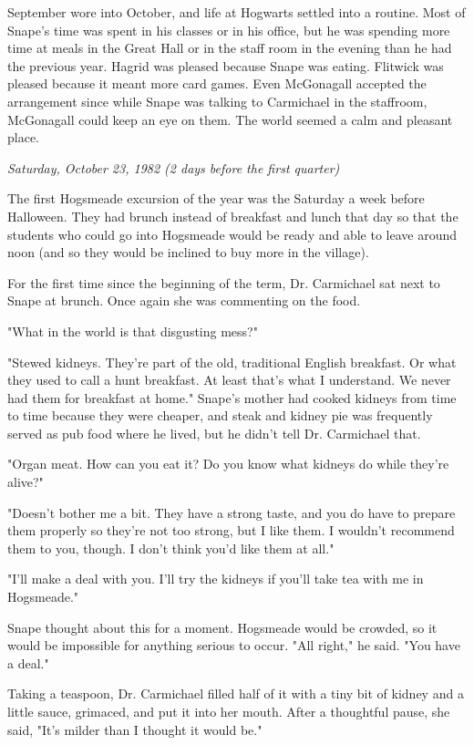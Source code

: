 \documentclass[a4paper,11pt]{article}
\begin{document}
September wore into October, and life at Hogwarts settled into a routine. Most of Snape's time was spent in his classes or in his office, but he was spending more time at meals in the Great Hall or in the staff room in the evening than he had the previous year. Hagrid was pleased because Snape was eating. Flitwick was pleased because it meant more card games. Even McGonagall accepted the arrangement since while Snape was talking to Carmichael in the staffroom, McGonagall could keep an eye on them. The world seemed a calm and pleasant place.

\emph{Saturday, October 23, 1982 (2 days before the first quarter)}

The first Hogsmeade excursion of the year was the Saturday a week before Halloween. They had brunch instead of breakfast and lunch that day so that the students who could go into Hogsmeade would be ready and able to leave around noon (and so they would be inclined to buy more in the village).

For the first time since the beginning of the term, Dr. Carmichael sat next to Snape at brunch. Once again she was commenting on the food.

"What in the world is that disgusting mess?"

"Stewed kidneys. They're part of the old, traditional English breakfast. Or what they used to call a hunt breakfast. At least that's what I understand. We never had them for breakfast at home." Snape's mother had cooked kidneys from time to time because they were cheaper, and steak and kidney pie was frequently served as pub food where he lived, but he didn't tell Dr. Carmichael that.

"Organ meat. How can you eat it? Do you know what kidneys do while they're alive?"

"Doesn't bother me a bit. They have a strong taste, and you do have to prepare them properly so they're not too strong, but I like them. I wouldn't recommend them to you, though. I don't think you'd like them at all."

"I'll make a deal with you. I'll try the kidneys if you'll take tea with me in Hogsmeade."

Snape thought about this for a moment. Hogsmeade would be crowded, so it would be impossible for anything serious to occur. "All right," he said. "You have a deal."

Taking a teaspoon, Dr. Carmichael filled half of it with a tiny bit of kidney and a little sauce, grimaced, and put it into her mouth. After a thoughtful pause, she said, "It's milder than I thought it would be."
\end{document}

